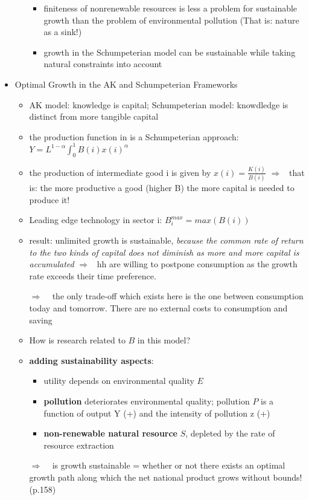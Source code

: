 \documentclass[12pt]{article}
\newcommand{\ar}{$\Rightarrow$ \ }
\begin{document}
\begin{itemize}
\begin{itemize}
\begin{itemize}
\item finiteness of nonrenewable resources is less a problem for sustainable growth than the problem of environmental pollution (That is: nature as a sink!)
\item growth in the Schumpeterian model can be sustainable while taking natural constraints into account
\end{itemize} 
\end{itemize}
\item Optimal Growth in the AK and Schumpeterian Frameworks \citep[Chapter 5,][]{EndGrowthAghion1998}
\begin{itemize}
\item AK model: knowledge is capital; Schumpeterian model: knowdledge is distinct from more tangible capital 
\item the production function in \cite{Acemoglu2012TheChange} is a Schumpeterian approach: $Y= L^{1-\alpha}\int_{0}^{1}B(i)x(i)^\alpha$
\item the production of intermediate good i is given by $x(i)=\frac{K(i)}{B(i)}$ \ar that is: the more productive a good (higher B) the more capital is needed to produce it!
\item Leading edge technology in sector i: $B_i^{max}=max(B(i))$
\item result: unlimited growth is sustainable, \textit{because the common rate of return to the two kinds of capital does not diminish as more and more capital is accumulated} \ar hh are willing to postpone consumption as the growth rate exceeds their time preference. 
\item[\ar] the only trade-off which exists here is the one between consumption today and tomorrow. There are no external costs to consumption and saving
\item How is research related to $B$ in this model?
\item \textbf{adding sustainability aspects}:
\begin{itemize}
\item utility depends on environmental quality $E$
\item \textbf{pollution} deteriorates environmental quality; pollution $P$ is a function of output Y (+) and the intensity of pollution z (+)
\item \textbf{non-renewable natural resource} $S$, depleted by the rate of resource extraction
\end{itemize}
\item[\ar] is growth sustainable = whether or not there exists an optimal growth path along which the net national product grows without bounds! (p.158)

\end{itemize}
\end{itemize}
\end{document}
